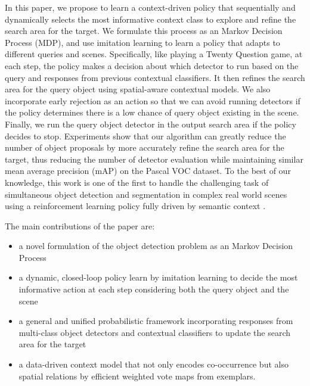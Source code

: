 In this paper, we propose to learn a context-driven policy that sequentially and dynamically selects the most informative context class to explore and refine the search area for the target.
We formulate this process as an Markov Decision Process (MDP), and use imitation learning to learn a policy that adapts to different queries and scenes.
Specifically, like playing a Twenty Question game, at each step, the policy makes a decision about which detector to run based on the query and responses from previous contextual classifiers. 
It then refines the search area for the query object using spatial-aware contextual models. We also incorporate early rejection as an action so that we can avoid running detectors if the policy determines there is a low chance of query object existing in the scene. Finally, we run the query object detector in the output search area if the policy decides to stop. Experiments show that our algorithm can greatly reduce the number of object proposals by more accurately refine the search area for the target, thus reducing the number of detector evaluation while maintaining similar mean average precision (mAP) on the Pascal VOC dataset. To the best of our knowledge, this work is one of the first to handle the challenging task of simultaneous object detection and segmentation in complex real world scenes using a reinforcement learning policy fully driven by semantic context .

The main contributions of the paper are:
\begin{itemize}
\item a novel formulation of the object detection problem as an Markov Decision Process 
\item a dynamic, closed-loop policy learn by imitation learning to decide the most informative action at each step considering both the query object and the scene 
\item a general and unified probabilistic framework incorporating responses from multi-class object detectors and contextual classifiers to update the search area for the target
\item a data-driven context model that not only encodes co-occurrence but also spatial relations by efficient weighted vote maps from exemplars.
\end{itemize}